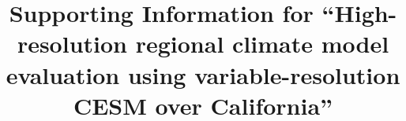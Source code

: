 \documentclass[ms]{agutexSI}
\begin{document}
%
%



\title{Supporting Information for ``High-resolution regional climate model evaluation using variable-resolution CESM over California''}
%
%

%
%












%
%

%
\end{document}

